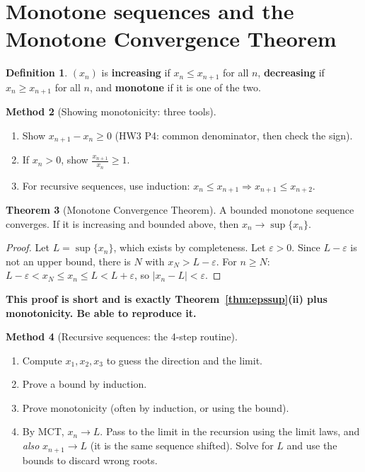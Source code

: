 \documentclass[11pt]{article}
\theoremstyle{definition}
\newtheorem{defn}{Definition}[section]
\newtheorem{thm}[defn]{Theorem}
\newtheorem{method}[defn]{Method}
\newcommand{\eps}{\varepsilon}
\newcommand{\key}[1]{\textcolor{red!70!black}{\textbf{#1}}}
\begin{document}
\section{Monotone sequences and the Monotone Convergence Theorem}

\begin{defn}
$(x_n)$ is \textbf{increasing} if $x_n\le x_{n+1}$ for all $n$,
\textbf{decreasing} if $x_n\ge x_{n+1}$ for all $n$, and
\textbf{monotone} if it is one of the two.
\end{defn}

\begin{method}[Showing monotonicity: three tools]
\begin{enumerate}[nosep]
  \item Show $x_{n+1}-x_n\ge0$ (HW3 P4: common denominator, then check the
        sign).
  \item If $x_n>0$, show $\frac{x_{n+1}}{x_n}\ge1$.
  \item For recursive sequences, use induction: $x_n\le x_{n+1}\Rightarrow x_{n+1}\le x_{n+2}$.
\end{enumerate}
\end{method}

\begin{thm}[Monotone Convergence Theorem]
A bounded monotone sequence converges. If it is increasing and bounded
above, then $x_n\to\sup\{x_n\}$.
\end{thm}
\begin{proof}
Let $L=\sup\{x_n\}$, which exists by completeness. Let $\eps>0$. Since
$L-\eps$ is not an upper bound, there is $N$ with $x_N>L-\eps$. For
$n\ge N$: $L-\eps<x_N\le x_n\le L<L+\eps$, so $|x_n-L|<\eps$.
\end{proof}
\noindent\key{This proof is short and is exactly Theorem~\ref{thm:epssup}(ii)
plus monotonicity. Be able to reproduce it.}

\begin{method}[Recursive sequences: the 4-step routine]
\begin{enumerate}[nosep]
  \item Compute $x_1,x_2,x_3$ to guess the direction and the limit.
  \item Prove a bound by induction.
  \item Prove monotonicity (often by induction, or using the bound).
  \item By MCT, $x_n\to L$. Pass to the limit in the recursion using the
        limit laws, and \emph{also} $x_{n+1}\to L$ (it is the same sequence
        shifted). Solve for $L$ and use the bounds to discard wrong roots.
\end{enumerate}
\end{method}
\end{document}
